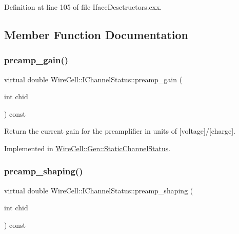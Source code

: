 Definition at line 105 of file Iface\+Desctructors.\+cxx.



\subsection{Member Function Documentation}
\mbox{\label{class_wire_cell_1_1_i_channel_status_ab9df0f4008fbdc708b7feea486da5c36}} 
\subsubsection{\texorpdfstring{preamp\+\_\+gain()}{preamp\_gain()}}
{\footnotesize\ttfamily virtual double Wire\+Cell\+::\+I\+Channel\+Status\+::preamp\+\_\+gain (\begin{DoxyParamCaption}\item[{int}]{chid }\end{DoxyParamCaption}) const\hspace{0.3cm}{\ttfamily [pure virtual]}}

Return the current gain for the preamplifier in units of \mbox{[}voltage\mbox{]}/\mbox{[}charge\mbox{]}. 

Implemented in \hyperlink{class_wire_cell_1_1_gen_1_1_static_channel_status_a7a43a5c1f263a985a705b24669b8cda1}{Wire\+Cell\+::\+Gen\+::\+Static\+Channel\+Status}.

\mbox{\label{class_wire_cell_1_1_i_channel_status_a330bd0e9627def4736eb1caed6a2fdba}} 
\subsubsection{\texorpdfstring{preamp\+\_\+shaping()}{preamp\_shaping()}}
{\footnotesize\ttfamily virtual double Wire\+Cell\+::\+I\+Channel\+Status\+::preamp\+\_\+shaping (\begin{DoxyParamCaption}\item[{int}]{chid }\end{DoxyParamCaption}) const\hspace{0.3cm}{\ttfamily [pure virtual]}}

